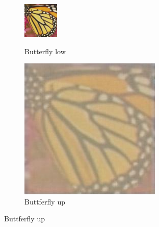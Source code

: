 \documentclass[11pt,twocolumn,twoside,paper=a4]{IEEEtran}
\begin{document}
\begin{figure}[ht]
\par\bigskip

\begin{subfigure}{0.45\textwidth}
  \centering
  \begin{minipage}[b]{0.45\textwidth}
    \includegraphics[width=\textwidth]{../images/butterfly_low.jpg}
    \caption{Butterfly low}
    \label{fig:butterfly_low}
  \end{minipage}
  \hfill
  \begin{minipage}[b]{0.45\textwidth}
    \includegraphics[width=\textwidth]{../images/butterfly_up.jpg}
    \caption{Buttferfly up}
    \label{fig:butterfly_up}
  \end{minipage}
\end{subfigure}


\end{figure}
\end{document}
